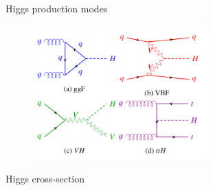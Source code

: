 \begin{frame}{Higgs production modes}
    \begin{figure}
        \centering
        \includegraphics[width=0.6\textwidth]{BackUp/Part1/Img/Higgs_prod_modes.png}
        
    \end{figure}
\end{frame}

\begin{frame}{Higgs cross-section}

\begin{figure}
    \centering
\end{figure}
    
\end{frame}


